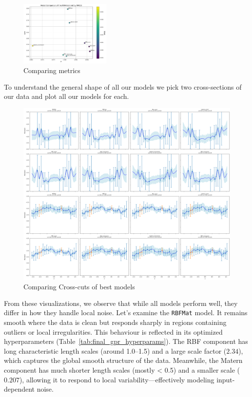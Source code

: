 \documentclass[11pt]{article}
\begin{document}
\begin{figure}[H]
    \centering
    \includegraphics[width=0.4\textwidth]{LatexPlots/final_gps_plots/metric_of_finalists_comparison.png}
    \caption{Comparing metrics}
    \label{fig:comparing_metrics}
\end{figure}
\noindent
To understand the general shape of all our models we pick two cross-sections of our data and plot all our models for each.
\begin{figure}[H]
    \centering
    \includegraphics[width=1\textwidth]{LatexPlots/final_gps_plots/gps_crosscuts_bestmodels.png}
    \caption{Comparing Cross-cuts of best models}
    \label{fig:crosscuts_bestmodels}
\end{figure}

\noindent
From these visualizations, we observe that while all models perform well, they differ in how they handle local noise.
Let's examine the \texttt{RBFMat} model. It remains smooth where the data is clean but responds sharply in regions containing outliers or local irregularities.
This behaviour is reflected in its optimized hyperparameters (Table~\ref{tab:final_gpr_hyperparams}). The RBF component has long characteristic length scales (around 1.0--1.5) and a large scale factor ($2.34$),
which captures the global smooth structure of the data. Meanwhile, the Matern component has much shorter length scales (mostly < 0.5) and a smaller scale ($0.207$), allowing it to respond to local variability—effectively modeling input-dependent noise.
\end{document}
